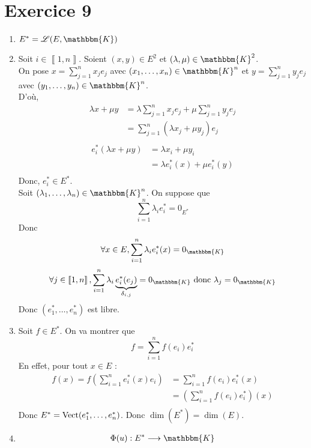 \part{Exercice 9}

\begin{enumerate}
	\item $E^* = \mathcal{L}(E, \mathbbm{K})$
	\item Soit $i \in \left\llbracket 1,n \right\rrbracket$. Soient $(x,y) \in E^2$ et $(\lambda, \mu) \in \mathbbm{K}^2$.\\
		On pose $x = \sum_{j=1}^n x_j e_j$ avec $(x_1, \ldots, x_n) \in \mathbbm{K}^n$ et $y = \sum_{j=1}^n y_j e_j$ avec $(y_1, \ldots, y_n) \in \mathbbm{K}^n$.\\
		D'où, 
		\begin{align*}
			\lambda x + \mu y &= \lambda \sum_{j=1}^n x_j e_j + \mu \sum_{j=1}^n y_j e_j \\
			&= \sum_{j=1}^n (\lambda x_j + \mu y_j) e_j \\
		\end{align*}
		\begin{align*}
			e_i^*(\lambda x + \mu y) &= \lambda x_i + \mu y_i \\
			&= \lambda e_i^*(x) + \mu e_i^*(y) \\
		\end{align*}
		Donc, $e_i^* \in E^*$.\\
		Soit $(\lambda_1, \ldots, \lambda_n) \in \mathbbm{K}^n$. On suppose que \[
			\sum_{i=1}^n \lambda_i e_i^* = 0_{E^*}
		\] Donc \[
			\forall x \in E, \sum_{i=1}^n \lambda_i e_i^*(x) = 0_\mathbbm{K}
		\] \[
			\forall j \in \left\llbracket 1,n \right\rrbracket, \sum_{i=1}^n \lambda_i \underbrace{e^*_i(e_j)}_{\delta_{i,j}} = 0_\mathbbm{K} \text{ donc } \lambda_j = 0_\mathbbm{K}
		\] Donc $(e_1^*, \ldots, e_n^*)$ est libre.
	\item Soit $f \in E^*$. On va montrer que \[
			f = \sum_{i=1}^n f(e_i) e_i^*
		\] En effet, pour tout $x \in E$ :
		\begin{align*}
			f(x) = f\left( \sum_{i=1}^n e_i^*(x) e_i \right) 
			&= \sum_{i=1}^n f(e_i) e_i^*(x) \\
			&= \left(\sum_{i=1}^n f(e_i) e_i^*\right)(x) \\
		\end{align*}
		Donc $E^* = \operatorname{Vect}(e_1^*, \ldots, e_n^*)$. Donc $\dim(E^*) = \dim(E)$.
	\item \begin{align*}
			\Phi(u): E^* &\longrightarrow \mathbbm{K} \\

\end{align*}
\end{enumerate}
